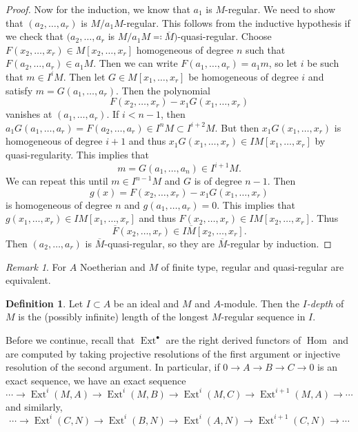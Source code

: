 \documentclass[leqno, openany]{memoir}
\theoremstyle{definition}
\newtheorem{defn}[thm]{Definition}
\theoremstyle{remark}
\newtheorem{rmk}[thm]{Remark}
\theoremstyle{plain}
\theoremstyle{definition}
\theoremstyle{remark}
\newcommand{\ol}[1]{\overline{#1}}
\DeclareMathOperator{\Hom}{Hom}
\DeclareMathOperator{\Ext}{Ext}
\begin{document}
\begin{proof}
    Now for the induction, we know that $a_1$ is $M$-regular. We need to show that $(a_2, \ldots, a_r)$ is $M/a_1 M$-regular. This follows from the inductive hypothesis if we check that $(a_2, \ldots, a_r$ is $M/a_1 M \eqqcolon \ol{M})$-quasi-regular. Choose $F(x_2, \ldots, x_r) \in M[x_2, \ldots, x_r]$ homogeneous of degree $n$ such that $F(a_2, \ldots, a_r) \in a_1 M$. Then we can write $F(a_1, \ldots, a_r) = a_1 m$, so let $i$ be such that $m \in I^i M$. Then let $G \in M[x_1, \ldots, x_r]$ be homogeneous of degree $i$ and satisfy $m = G(a_1, \ldots, a_r)$. Then the polynomial
    \[ F(x_2, \ldots, x_r) - x_1 G(x_1, \ldots, x_r) \]
    vanishes at $(a_1, \ldots, a_r)$. If $i < n-1$, then $a_1 G(a_1, \ldots, a_r) = F(a_2, \ldots, a_r) \in I^n M \subset I^{i+2} M$. But then $x_1 G(x_1, \ldots, x_r)$ is homogeneous of degree $i+1$ and thus $x_1 G(x_1, \ldots, x_r) \in IM[x_1, \ldots, x_r]$ by quasi-regularity. This implies that 
    \[ m = G(a_1, \ldots, a_n) \in I^{i+1}M. \]
    We can repeat this until $m \in I^{n-1}M$ and $G$ is of degree $n-1$. Then 
    \[ g(x) = F(x_2, \ldots, x_r) - x_1 G(x_1, \ldots, x_r) \]
    is homogeneous of degree $n$ and $g(a_1, \ldots, a_r) = 0$. This implies that $g(x_1, \ldots, x_r) \in IM[x_1, \ldots, x_r]$ and thus $F(x_2, \ldots, x_r) \in IM[x_2, \ldots, x_r]$. Thus
    \[ \ol{F}(x_2, \ldots, x_r) \in I \ol{M}[x_2, \ldots, x_r]. \]
    Then $(a_2, \ldots, a_r)$ is $\ol{M}$-quasi-regular, so they are $\ol{M}$-regular by induction.
\end{proof}

\begin{rmk}
    For $A$ Noetherian and $M$ of finite type, regular and quasi-regular are equivalent.
\end{rmk}

\begin{defn}
    Let $I \subset A$ be an ideal and $M$ and $A$-module. Then the \textit{$I$-depth} of $M$ is the (possibly infinite) length of the longest $M$-regular sequence in $I$. 
\end{defn}

Before we continue, recall that $\Ext^{\bullet}$ are the right derived functors of $\Hom$ and are computed by taking projective resolutions of the first argument or injective resolution of the second argument. In particular, if $0 \to A \to B \to C \to 0$ is an exact sequence, we have an exact sequence
\[ \cdots \to \Ext^i(M, A) \to \Ext^i(M, B) \to \Ext^i(M, C) \to \Ext^{i+1}(M,A) \to \cdots \]
and similarly, 
\[ \cdots \to \Ext^i(C,N) \to \Ext^i(B,N) \to \Ext^i(A,N) \to \Ext^{i+1}(C,N) \to \cdots \]
\end{document}
